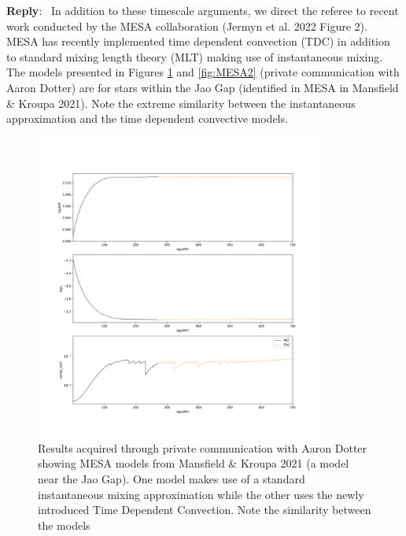 \documentclass[11pt]{article}
\newenvironment{reply}
   {\medskip \noindent \begin{sf}\textbf{Reply}:\  }
   {\medskip \end{sf}}
\begin{document}
\begin{reply}
	In addition to these timescale arguments, we direct the referee to recent
	work conducted by the MESA collaboration (Jermyn et al. 2022 Figure 2).
	MESA has recently implemented time dependent convection (TDC) in addition
	to standard mixing length theory (MLT) making use of instantaneous mixing.
	The models presented in Figures \ref{fig:MESA1} and \ref{fig:MESA2}
	(private communication with Aaron Dotter) are for stars within the Jao Gap
	(identified in MESA in Mansfield \& Kroupa 2021). Note the extreme
	similarity between the instantaneous approximation and the time dependent
	convective models.

	\begin{figure}
		\centering
		\includegraphics[width=0.85\textwidth]{./Figure_4.png}
		\caption{Results acquired through private communication with Aaron Dotter showing
		MESA models from Mansfield \& Kroupa 2021 (a model near the Jao Gap). One
		model makes use of a standard instantaneous mixing approximation while the other
		uses the newly introduced Time Dependent Convection. Note the similarity between the
		models}
		\label{fig:MESA1}
	\end{figure}
	\begin{figure}
		\centering

\end{figure}
\end{reply}
\end{document}
